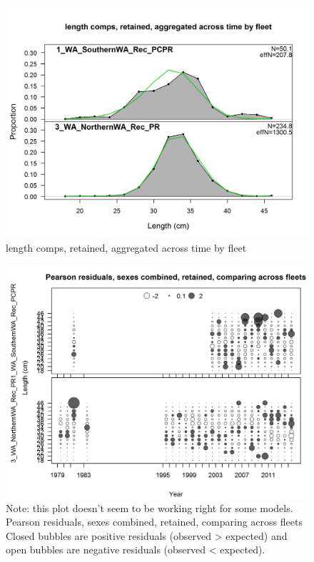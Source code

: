 \documentclass[12pt,]{article}
\begin{document}
\begin{figure}[htbp]
\centering
\includegraphics{./r4ss/plots_mod1/comp_lenfit_mkt2_aggregated_across_time.png}
\caption{length comps, retained, aggregated across time by fleet
\label{fig:mod1_9_comp_lenfit_mkt2_aggregated_across_time}}
\end{figure}

\begin{figure}[htbp]
\centering
\includegraphics{./r4ss/plots_mod1/comp_lenfit_sex1mkt2_multi-fleet_comparison.png}
\caption{Note: this plot doesn't seem to be working right for some
models. Pearson residuals, sexes combined, retained, comparing across
fleets\\
Closed bubbles are positive residuals (observed \textgreater{} expected)
and open bubbles are negative residuals (observed \textless{} expected).
\label{fig:mod1_10_comp_lenfit_sex1mkt2_multi-fleet_comparison}}
\end{figure}
\end{document}
